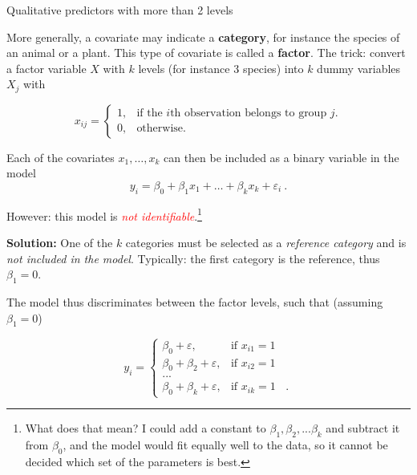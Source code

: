 \documentclass[
  10pt,
  ignorenonframetext,
]{beamer}
\begin{document}
\begin{frame}
\begin{block}{Qualitative predictors with more than 2 levels}
\protect\hypertarget{qualitative-predictors-with-more-than-2-levels}{}
\(~\)

More generally, a covariate may indicate a \textbf{category}, for
instance the species of an animal or a plant. This type of covariate is
called a \textbf{factor}. The trick: convert a factor variable \(X\)
with \(k\) levels (for instance 3 species) into \(k\) dummy variables
\(X_j\) with \vspace{2mm}

\begin{equation*}
x_{ij} = \left\{ 
\begin{array} {ll}
1, & \text{if the $i$th observation belongs to group $j$}.\\
0, & \text{otherwise.}
\end{array}\right.
\end{equation*}

\vspace{4mm}

Each of the covariates \(x_1,\ldots, x_k\) can then be included as a
binary variable in the model \begin{equation*}
y_i = \beta_0 + \beta_1 x_1 + \ldots + \beta_k x_k + \varepsilon_i \ .
\end{equation*}

\vspace{6mm}

However: this model is
\emph{\textcolor{red}{not identifiable}}.\footnote{What does that mean? I could add a constant to $\beta_1, \beta_2, ...\beta_k$ and subtract it from $\beta_0$, and the model would fit equally well to the data, so it cannot be decided which set of the parameters is best.}
\end{block}
\end{frame}

\begin{frame}
\textbf{Solution:} One of the \(k\) categories must be selected as a
\emph{reference category} and is \emph{not included in the model}.
Typically: the first category is the reference, thus \(\beta_1=0\).

\vspace{2mm}

The model thus discriminates between the factor levels, such that
(assuming \(\beta_1=0\))

\begin{equation*}
y_i = \left\{
\begin{array}{ll}
\beta_0 + \varepsilon, & \text{if $x_{i1}=1$ }\\
\beta_0 + \beta_2 + \varepsilon, & \text{if $x_{i2}=1$ }\\
...\\
\beta_0 + \beta_k + \varepsilon, & \text{if $x_{ik}=1$ } \ .
\end{array}\right.
\end{equation*}
\end{frame}
\end{document}
